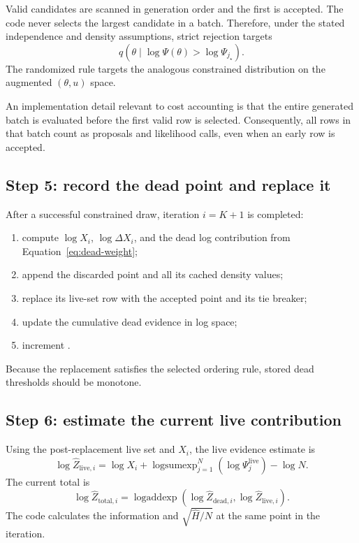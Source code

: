 \documentclass[11pt,a4paper]{article}
\newcommand{\code}[1]{\texttt{\detokenize{#1}}}
\begin{document}
Valid candidates are scanned in generation order and the first is accepted.
The code never selects the largest candidate in a batch.  Therefore, under
the stated independence and density assumptions, strict rejection targets
\[
  q\!\left(\theta\mid
    \log\Psi(\theta)>\log\Psi_{j_\star}\right).
\]
The randomized rule targets the analogous constrained distribution on the
augmented \((\theta,u)\) space.

An implementation detail relevant to cost accounting is that the entire
generated batch is evaluated before the first valid row is selected.
Consequently, all rows in that batch count as proposals and likelihood calls,
even when an early row is accepted.

\subsection{Step 5: record the dead point and replace it}

After a successful constrained draw, iteration \(i=K+1\) is completed:

\begin{enumerate}
  \item compute \(\log X_i\), \(\log\Delta X_i\), and the dead log
        contribution from Equation~\eqref{eq:dead-weight};
  \item append the discarded point and all its cached density values;
  \item replace its live-set row with the accepted point and its tie breaker;
  \item update the cumulative dead evidence in log space;
  \item increment \code{niter}.
\end{enumerate}

Because the replacement satisfies the selected ordering rule, stored dead
thresholds should be monotone.

\subsection{Step 6: estimate the current live contribution}

Using the post-replacement live set and \(X_i\), the live evidence estimate is
\begin{equation}
  \log \widehat Z_{\mathrm{live},i}
  = \log X_i+
    \operatorname{logsumexp}_{j=1}^{N}
       (\log\Psi_j^{\mathrm{live}})
    -\log N.
  \label{eq:live-logz}
\end{equation}
The current total is
\[
  \log\widehat Z_{\mathrm{total},i}
  =\operatorname{logaddexp}
     \left(\log\widehat Z_{\mathrm{dead},i},
           \log\widehat Z_{\mathrm{live},i}\right).
\]
The code calculates the information and
\(\sqrt{\widehat H/N}\) at the same point in the iteration.
\end{document}
